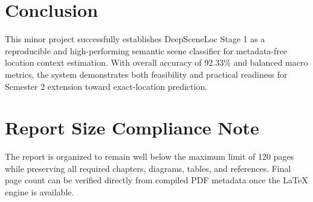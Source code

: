 \section{Conclusion}
This minor project successfully establishes DeepSceneLoc Stage 1 as a reproducible and high-performing semantic scene classifier for metadata-free location context estimation. With overall accuracy of 92.33\% and balanced macro metrics, the system demonstrates both feasibility and practical readiness for Semester 2 extension toward exact-location prediction.

\section{Report Size Compliance Note}
The report is organized to remain well below the maximum limit of 120 pages while preserving all required chapters, diagrams, tables, and references. Final page count can be verified directly from compiled PDF metadata once the LaTeX engine is available.

